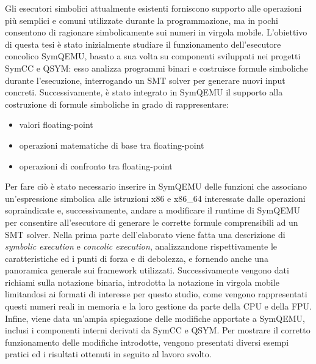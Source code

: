 \documentclass[Lau, oneside]{sapthesis}%
\begin{document}
\newpage
Gli esecutori simbolici attualmente esistenti forniscono supporto alle operazioni più semplici e comuni utilizzate durante la programmazione, ma in pochi consentono di ragionare simbolicamente sui numeri in virgola mobile.
\newline \newline
L'obiettivo di questa tesi è stato inizialmente studiare il funzionamento dell'esecutore concolico SymQEMU, basato a sua volta su componenti sviluppati nei progetti SymCC e QSYM: esso analizza programmi binari e costruisce formule simboliche durante l'esecuzione, interrogando un SMT solver per generare nuovi input concreti.
\newline 
Successivamente, è stato integrato in SymQEMU il supporto alla costruzione di formule simboliche in grado di rappresentare:
\begin{itemize}
    \item valori floating-point
    \item operazioni matematiche di base tra floating-point
    \item operazioni di confronto tra floating-point
\end{itemize}
Per fare ciò è stato necessario inserire in SymQEMU delle funzioni che associano un'espressione simbolica alle istruzioni x86 e x86\_64 interessate dalle operazioni sopraindicate e, successivamente, andare a modificare il runtime di SymQEMU per consentire all'esecutore di generare le corrette formule comprensibili ad un SMT solver.
\newline \newline \newline
Nella prima parte dell'elaborato viene fatta una descrizione di \textit{symbolic execution} e \textit{concolic execution}, analizzandone rispettivamente le caratteristiche ed i punti di forza e di debolezza, e fornendo anche una panoramica generale sui framework utilizzati.
\newline \newline
Successivamente vengono dati richiami sulla notazione binaria, introdotta la notazione in virgola mobile limitandosi ai formati di interesse per questo studio, come vengono rappresentati questi numeri reali in memoria e la loro gestione da parte della CPU e della FPU.
\newline \newline
Infine, viene data un'ampia spiegazione delle modifiche apportate a SymQEMU, inclusi i componenti interni derivati da SymCC e QSYM.
\newline
Per mostrare il corretto funzionamento delle modifiche introdotte, vengono presentati diversi esempi pratici ed i risultati ottenuti in seguito al lavoro svolto.
\end{document}
